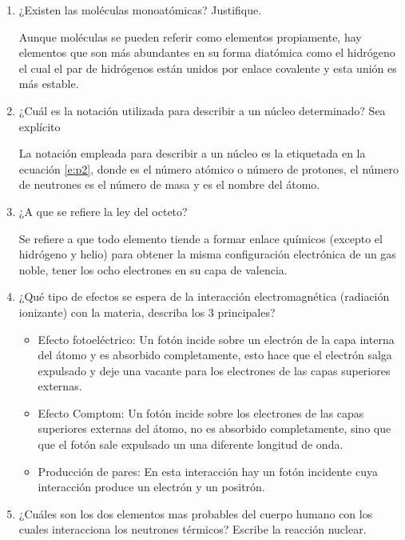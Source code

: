 \newlength{\strutheight}
\settoheight{\strutheight}{\strut}
\begin{enumerate}
  \item ¿Existen las moléculas monoatómicas? Justifique.
  
  Aunque moléculas se pueden referir como elementos propiamente, hay elementos que son más abundantes en su forma diatómica como el hidrógeno el cual el par de hidrógenos están unidos por enlace covalente y esta unión es más estable.


  \item ¿Cuál es la notación utilizada para describir a un núcleo determinado? Sea explícito
  
La notación empleada para describir a un núcleo es la etiquetada en la ecuación \ref{e:p2}, donde  es el número atómico o número de protones,  el número de neutrones  es el número de masa  y  es el nombre del átomo.

  \item ¿A que se refiere la ley del octeto?
  
Se refiere a que todo elemento tiende a formar enlace químicos (excepto el hidrógeno y helio) para obtener la misma configuración electrónica de un gas noble, tener los ocho electrones en su capa de valencia. 

  \item ¿Qué tipo de efectos se espera de la interacción electromagnética (radiación ionizante) con la materia, describa los 3 principales?
  
\begin{itemize}
  \item Efecto fotoeléctrico: Un fotón incide sobre un electrón de la capa interna del átomo y es absorbido completamente, esto hace que el electrón salga expulsado y deje una vacante para los electrones de las capas superiores externas.
  \item Efecto Comptom: Un fotón incide sobre los electrones de las capas superiores externas del átomo, no es absorbido completamente, sino que que el fotón sale expulsado un una diferente longitud de onda.
  \item Producción de pares: En esta interacción hay un fotón incidente cuya interacción produce un electrón y un positrón.
\end{itemize}


  \item ¿Cuáles son los dos elementos mas probables del cuerpo humano con los cuales interacciona los neutrones térmicos? Escribe la reacción nuclear.
  

\end{enumerate}
